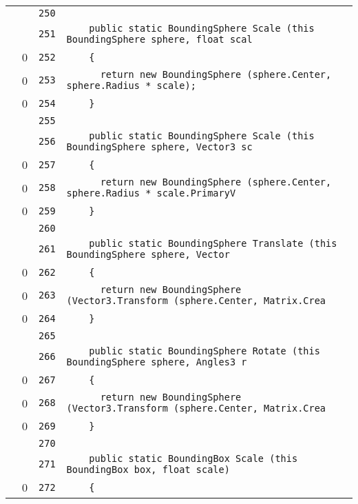 \documentclass[a4paper,10pt]{article}
\begin{document}
\begin{longtable}[l]{lrrl}
\cellcolor{gray} &  & \verb~250~ & \verb~~\\
\cellcolor{gray} &  & \verb~251~ & \verb~    public static BoundingSphere Scale (this BoundingSphere sphere, float scal~\\
\cellcolor{red} & 0 & \verb~252~ & \verb~    {~\\
\cellcolor{red} & 0 & \verb~253~ & \verb~      return new BoundingSphere (sphere.Center, sphere.Radius * scale);~\\
\cellcolor{red} & 0 & \verb~254~ & \verb~    }~\\
\cellcolor{gray} &  & \verb~255~ & \verb~~\\
\cellcolor{gray} &  & \verb~256~ & \verb~    public static BoundingSphere Scale (this BoundingSphere sphere, Vector3 sc~\\
\cellcolor{red} & 0 & \verb~257~ & \verb~    {~\\
\cellcolor{red} & 0 & \verb~258~ & \verb~      return new BoundingSphere (sphere.Center, sphere.Radius * scale.PrimaryV~\\
\cellcolor{red} & 0 & \verb~259~ & \verb~    }~\\
\cellcolor{gray} &  & \verb~260~ & \verb~~\\
\cellcolor{gray} &  & \verb~261~ & \verb~    public static BoundingSphere Translate (this BoundingSphere sphere, Vector~\\
\cellcolor{red} & 0 & \verb~262~ & \verb~    {~\\
\cellcolor{red} & 0 & \verb~263~ & \verb~      return new BoundingSphere (Vector3.Transform (sphere.Center, Matrix.Crea~\\
\cellcolor{red} & 0 & \verb~264~ & \verb~    }~\\
\cellcolor{gray} &  & \verb~265~ & \verb~~\\
\cellcolor{gray} &  & \verb~266~ & \verb~    public static BoundingSphere Rotate (this BoundingSphere sphere, Angles3 r~\\
\cellcolor{red} & 0 & \verb~267~ & \verb~    {~\\
\cellcolor{red} & 0 & \verb~268~ & \verb~      return new BoundingSphere (Vector3.Transform (sphere.Center, Matrix.Crea~\\
\cellcolor{red} & 0 & \verb~269~ & \verb~    }~\\
\cellcolor{gray} &  & \verb~270~ & \verb~~\\
\cellcolor{gray} &  & \verb~271~ & \verb~    public static BoundingBox Scale (this BoundingBox box, float scale)~\\
\cellcolor{red} & 0 & \verb~272~ & \verb~    {~\\

\end{longtable}
\end{document}
